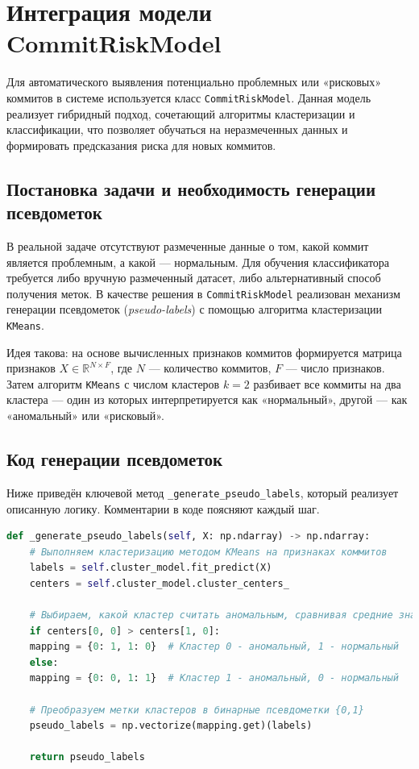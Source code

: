 \section{Интеграция модели CommitRiskModel} \label{ch3:sec3}

Для автоматического выявления потенциально проблемных или «рисковых» коммитов в системе используется класс \texttt{CommitRiskModel}. Данная модель реализует гибридный подход, сочетающий алгоритмы кластеризации и классификации, что позволяет обучаться на неразмеченных данных и формировать предсказания риска для новых коммитов.

\subsection{Постановка задачи и необходимость генерации псевдометок}

В реальной задаче отсутствуют размеченные данные о том, какой коммит является проблемным, а какой — нормальным. Для обучения классификатора требуется либо вручную размеченный датасет, либо альтернативный способ получения меток. В качестве решения в \texttt{CommitRiskModel} реализован механизм генерации псевдометок (\textit{pseudo-labels}) с помощью алгоритма кластеризации \texttt{KMeans}.

Идея такова: на основе вычисленных признаков коммитов формируется матрица признаков \(X \in \mathbb{R}^{N \times F}\), где \(N\) — количество коммитов, \(F\) — число признаков. Затем алгоритм \texttt{KMeans} с числом кластеров \(k=2\) разбивает все коммиты на два кластера — один из которых интерпретируется как «нормальный», другой — как «аномальный» или «рисковый».

\subsection{Код генерации псевдометок}

Ниже приведён ключевой метод \texttt{\_generate\_pseudo\_labels}, который реализует описанную логику. Комментарии в коде поясняют каждый шаг.

\begin{lstlisting}[language=Python, caption={Генерация псевдометок методом KMeans}]
	def _generate_pseudo_labels(self, X: np.ndarray) -> np.ndarray:
	# Выполняем кластеризацию методом KMeans на признаках коммитов
	labels = self.cluster_model.fit_predict(X)
	centers = self.cluster_model.cluster_centers_
	
	# Выбираем, какой кластер считать аномальным, сравнивая средние значения по первому признаку (lines_added)
	if centers[0, 0] > centers[1, 0]:
	mapping = {0: 1, 1: 0}  # Кластер 0 - аномальный, 1 - нормальный
	else:
	mapping = {0: 0, 1: 1}  # Кластер 1 - аномальный, 0 - нормальный
	
	# Преобразуем метки кластеров в бинарные псевдометки {0,1}
	pseudo_labels = np.vectorize(mapping.get)(labels)
	
	return pseudo_labels
\end{lstlisting}

